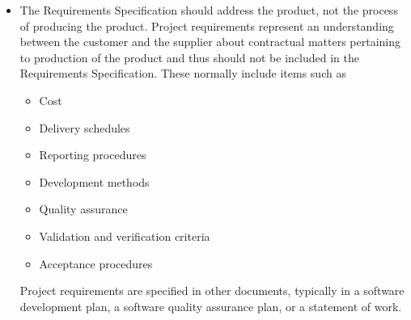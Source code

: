 {\begin{itemize}
\item The Requirements Specification should address the product, not the process of producing the product. Project requirements represent an understanding between the customer and the supplier about contractual matters pertaining to production of the product and thus should not be included in the Requirements Specification. These normally include items such as
	\begin{itemize}
	\item Cost
	\item Delivery schedules
	\item Reporting procedures
	\item Development methods
	\item Quality assurance
	\item Validation and verification criteria
	\item Acceptance procedures
	\end{itemize}
Project requirements are specified in other documents, typically in a software development plan, a software quality assurance plan, or a statement of work.
\end{itemize}
\clearpage
}

\newpage
	

	{\linespread{1.0} \tableofcontents}
	\newpage
	
		
	\newpage
		
    
    \listoffigures
        
    \listoftables
			
	
	
	
	
	
	
	
	\appendix
	
